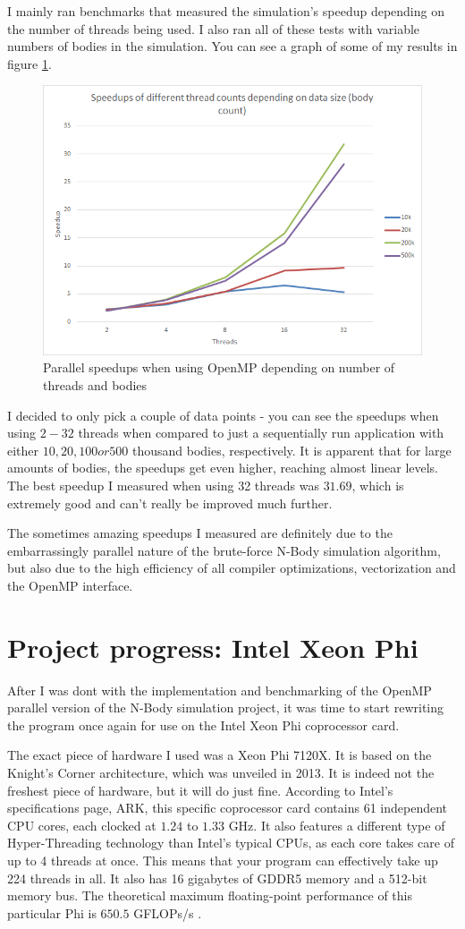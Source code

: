\documentclass[journal]{IEEEtran}
\begin{document}
			I mainly ran benchmarks that measured the simulation's speedup depending on the number of threads being used. I also ran all of these tests with variable numbers of bodies in the simulation. You can see a graph of some of my results in figure \ref{parspeedup}. 
			
			\begin{figure}[ht]			
				\centering
				\includegraphics[width=.45\textwidth]{parspeedup.png}
				\caption{\label{parspeedup}Parallel speedups when using OpenMP depending on number of threads and bodies}
			\end{figure} 
			
			I decided to only pick a couple of data points - you can see the speedups when using $2-32$ threads when compared to just a sequentially run application with either $10, 20, 100 or 500$ thousand bodies, respectively. It is apparent that for large amounts of bodies, the speedups get even higher, reaching almost linear levels. The best speedup I measured when using 32 threads was $31.69$, which is extremely good and can't really be improved much further.
			
			The sometimes amazing speedups I measured are definitely due to the embarrassingly parallel nature of the brute-force N-Body simulation algorithm, but also due to the high efficiency of all compiler optimizations, vectorization and the OpenMP interface.
			
	\section{Project progress: Intel Xeon Phi}
	\label{phisection}
		
		After I was dont with the implementation and benchmarking of the OpenMP parallel version of the N-Body simulation project, it was time to start rewriting the program once again for use on the Intel Xeon Phi coprocessor card.
		
		The exact piece of hardware I used was a Xeon Phi 7120X. It is based on the Knight's Corner architecture, which was unveiled in 2013. It is indeed not the freshest piece of hardware, but it will do just fine.
		According to Intel's specifications page, ARK\cite{ark}, this specific coprocessor card contains 61 independent CPU cores, each clocked at $1.24$ to $1.33$ GHz. It also features a different type of Hyper-Threading technology than Intel's typical CPUs, as each core takes care of up to 4 threads at once. This means that your program can effectively take up 224 threads in all. It also has 16 gigabytes of GDDR5 memory and a 512-bit memory bus. The theoretical maximum floating-point performance of this particular Phi is $650.5$ GFLOPs/s \cite{tpu}.
		
\end{document}

